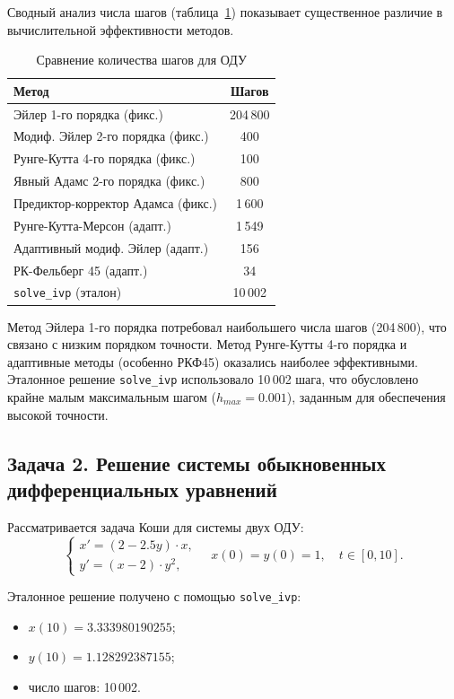 \documentclass[a4paper]{article}
\begin{document}
Сводный анализ числа шагов (таблица~\ref{tab:task1_steps}) показывает существенное различие в вычислительной эффективности методов.

\begin{table}[H]
\centering
\caption{Сравнение количества шагов для ОДУ}
\label{tab:task1_steps}
\begin{tabular}{|l|c|}
\hline
\textbf{Метод} & \textbf{Шагов} \\
\hline
Эйлер 1-го порядка (фикс.)           & 204\,800 \\
Модиф. Эйлер 2-го порядка (фикс.)    & 400 \\
Рунге-Кутта 4-го порядка (фикс.)     & 100 \\
Явный Адамс 2-го порядка (фикс.)     & 800 \\
Предиктор-корректор Адамса (фикс.)   & 1\,600 \\
Рунге-Кутта-Мерсон (адапт.)          & 1\,549 \\
Адаптивный модиф. Эйлер (адапт.)     & 156 \\
РК-Фельберг 45 (адапт.)              & 34 \\
\hline
\texttt{solve\_ivp} (эталон)          & 10\,002 \\
\hline
\end{tabular}
\end{table}

Метод Эйлера 1-го порядка потребовал наибольшего числа шагов (204\,800), что связано с низким порядком точности. Метод Рунге-Кутты 4-го порядка и адаптивные методы (особенно РКФ45) оказались наиболее эффективными. Эталонное решение \texttt{solve\_ivp} использовало 10\,002 шага, что обусловлено крайне малым максимальным шагом ($h_{max} = 0.001$), заданным для обеспечения высокой точности.

\subsection*{Задача 2. Решение системы обыкновенных дифференциальных уравнений}

Рассматривается задача Коши для системы двух ОДУ:
\begin{equation}
\begin{cases}
x' = (2 - 2.5y) \cdot x,\\
y' = (x - 2) \cdot y^2,
\end{cases}
\quad x(0) = y(0) = 1, \quad t \in [0, 10].
\label{eq:task2}
\end{equation}

Эталонное решение получено с помощью \texttt{solve\_ivp}:
\begin{itemize}
    \item $x(10) = 3.333980190255$;
    \item $y(10) = 1.128292387155$;
    \item число шагов: 10\,002.
\end{itemize}
\end{document}
